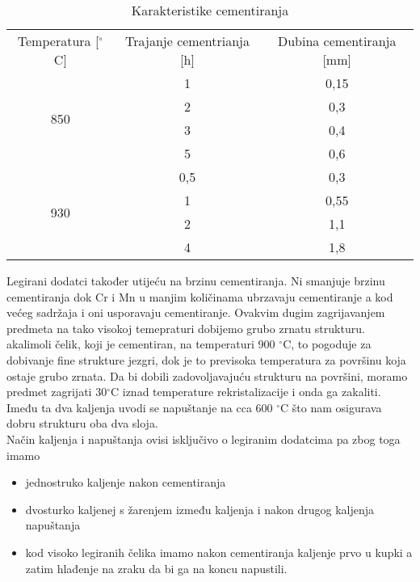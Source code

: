 \documentclass[a4paper,12pt]{article}
\numberwithin{figure}{section}
\begin{document}
\begin{table}[!h]
\centering
\caption{Karakteristike cementiranja}
\label{my-label}
\begin{tabular}{ccc}
Temperatura {[}$^{\circ}$C{]}   & Trajanje cementrianja {[}h{]} & Dubina cementiranja {[}mm{]} \\
\multirow{4}{*}{850} & 1                             & 0,15                         \\
                     & 2                             & 0,3                          \\
                     & 3                             & 0,4                          \\
                     & 5                             & 0,6                          \\
\multirow{4}{*}{930} & 0,5                           & 0,3                          \\
                     & 1                             & 0,55                         \\
                     & 2                             & 1,1                          \\
                     & 4                             & 1,8                         
\end{tabular}
\end{table}
\FloatBarrier
Legirani dodatci također utijeću na brzinu cementiranja. Ni smanjuje brzinu cementiranja dok Cr i Mn u manjim količinama ubrzavaju cementiranje a kod većeg sadržaja i oni usporavaju cementiranje. Ovakvim dugim zagrijavanjem predmeta na tako visokoj temepraturi dobijemo grubo zrnatu strukturu. akalimoli čelik, koji je cementiran, na temperaturi 900 $^{\circ}$C, to pogoduje za dobivanje fine strukture jezgri, dok je to previsoka temperatura za površinu koja ostaje grubo zrnata. Da bi dobili zadovoljavajuću strukturu na površini, moramo predmet zagrijati 30$^{\circ}$C iznad temperature rekristalizacije i onda ga zakaliti. Imeđu ta dva kaljenja uvodi se napuštanje na cca 600 $^{\circ}$C što nam osigurava dobru strukturu oba dva sloja. \\
Način kaljenja i napuštanja ovisi isključivo o legiranim dodatcima pa zbog toga imamo
\begin{itemize}
\item jednostruko kaljenje nakon cementiranja
\item dvosturko kaljenej s žarenjem između kaljenja i nakon drugog kaljenja napuštanja
\item kod visoko legiranih čelika imamo nakon cementiranja kaljenje prvo u kupki a zatim hlađenje na zraku da bi ga na koncu napustili.
\end{itemize}
\end{document}
